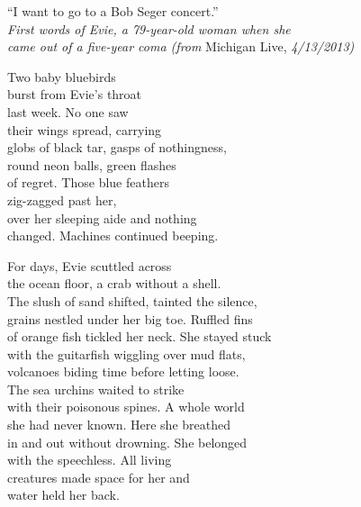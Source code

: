 \documentclass[twoside,10pt]{book}
\begin{document}
``I want to go to a Bob Seger concert.''\\
\emph{First words of Evie, a 79-year-old woman when she\\
came out of a five-year coma (from} Michigan Live, \emph{4/13/2013)}

Two baby bluebirds\\
burst from Evie's throat\\
last week. No one saw\\
their wings spread, carrying\\
globs of black tar, gasps of nothingness,\\
round neon balls, green flashes\\
of regret. Those blue feathers\\
zig-zagged past her,\\
over her sleeping aide and nothing\\
changed. Machines continued beeping.

For days, Evie scuttled across\\
the ocean floor, a crab without a shell.\\
The slush of sand shifted, tainted the silence,\\
grains nestled under her big toe. Ruffled fins\\
of orange fish tickled her neck. She stayed stuck\\
with the guitarfish wiggling over mud flats,\\
volcanoes biding time before letting loose.\\
The sea urchins waited to strike\\
with their poisonous spines. A whole world\\
she had never known. Here she breathed\\
in and out without drowning. She belonged\\
with the speechless. All living\\
creatures made space for her and\\
water held her back.
\end{document}
